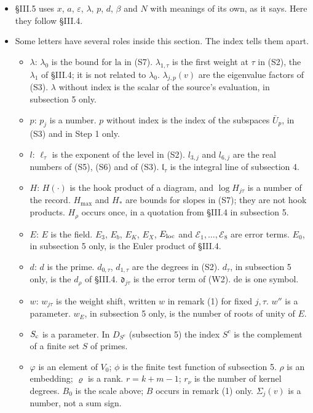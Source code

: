 \documentclass[11pt,letterpaper]{article}
\begin{document}
\begin{itemize}[leftmargin=1.6em,itemsep=1pt,topsep=3pt]
Parts (a), (b) of Theorem~\ref{sa:thm} are not the inputs (a)--(e) of ``Row by row''.
\item \S III.5 uses $x$, $a$, $\varepsilon$, $\lambda$, $p$, $d$, $\beta$ and $N$ with meanings of its
own, as it says. Here they follow \S III.4.
\item Some letters have several roles inside this section. The index tells them apart.
\begin{itemize}[leftmargin=1.4em,itemsep=0pt,topsep=1pt]
\item $\lambda$: $\lambda_0$ is the bound for $\mathrm{la}$ in (S7). $\lambda_{1,\tau}$ is the first weight
at $\tau$ in (S2), the $\lambda_1$ of \S III.4; it is not related to $\lambda_0$. $\lambda_{j,p}(v)$ are the
eigenvalue factors of (S3). $\lambda$ without index is the scalar of the source's evaluation, in
subsection 5 only.
\item $p$: $p_j$ is a number. $p$ without index is the index of the subspaces $\bar U_p$, in (S3) and in
Step 1 only.
\item $l$: $\ell_\tau$ is the exponent of the level in (S2). $l_{3,j}$ and $l_{6,j}$ are the real numbers
of (S5), (S6) and of (S3). $\mathfrak l_\tau$ is the integral line of subsection 4.
\item $H$: $H(\cdot)$ is the hook product of a diagram, and $\log H_{j\tau}$ is a number of the record.
$H_{\max}$ and $H_*$ are bounds for slopes in (S7); they are not hook products. $H_\rho$ occurs once, in
a quotation from \S III.4 in subsection 5.
\item $E$: $E$ is the field. $E_3$, $E_b$, $E_K$, $E_X$, $E_{\rm loc}$ and
$\mathcal E_1,\dots,\mathcal E_8$ are error terms. $E_0$, in subsection 5 only, is the Euler product of
\S III.4.
\item $d$: $d$ is the prime. $d_{0,\tau}$, $d_{1,\tau}$ are the degrees in (S2). $d_\tau$, in subsection 5
only, is the $d_\rho$ of \S III.4. $\mathfrak d_{j\tau}$ is the error term of (W2). $\mathrm{de}$ is one
symbol.
\item $w$: $w_{j\tau}$ is the weight shift, written $w$ in remark (1) for fixed $j,\tau$. $w''$ is a
parameter. $w_E$, in subsection 5 only, is the number of roots of unity of $E$.
\item $S_{\rm c}$ is a parameter. In $D_{S^c}$ (subsection 5) the index $S^c$ is the complement of a
finite set $S$ of primes.
\item $\varphi$ is an element of $V_0$; $\phi$ is the finite test function of subsection 5. $\rho$ is an
embedding; $\varrho$ is a rank. $r=k+m-1$; $r_\nu$ is the number of kernel degrees. $B_0$ is the scale
above; $B$ occurs in remark (1) only. $\Sigma_j(v)$ is a number, not a sum sign.
\end{itemize}
\end{itemize}
\end{document}
